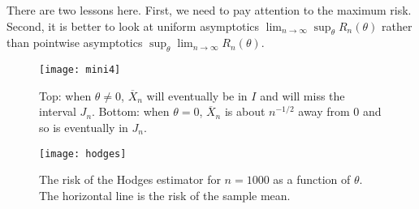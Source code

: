 \documentclass[twoside,12pt]{article}
\begin{document}
There are two lessons here.
First, we need to pay attention to the 
maximum risk.
Second,
it is better to look at
uniform asymptotics $\lim_{n\to\infty} \sup_\theta R_n(\theta)$ rather than
pointwise asymptotics $\sup_\theta \lim_{n\to\infty}  R_n(\theta)$.






\begin{figure}
\begin{center}
\texttt{[image: mini4]}
\end{center}
\vspace{-8in}
\caption{Top: when $\theta\neq 0$, $\overline{X}_n$ will eventually be in $I$
and will miss the interval $J_n$.
Bottom: when $\theta= 0$, $\overline{X}_n$ is
about $n^{-1/2}$ away from 0 and so is
eventually in $J_n$.}
\label{fig::hodges1}
\end{figure}

\begin{figure}
\begin{center}
\vspace{-1in}
\texttt{[image: hodges]}
\end{center}
\caption{The risk of the Hodges estimator for $n=1000$ as a function of $\theta$.
The horizontal line is the risk of the sample mean.}
\label{fig::hodgesrisk}
\end{figure}
\end{document}
